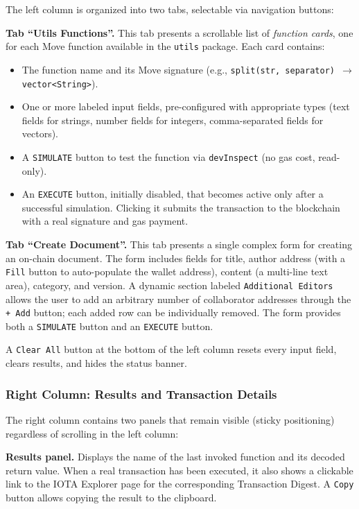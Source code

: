 \documentclass[12pt,a4paper]{article}
\begin{document}
The left column is organized into two tabs, selectable via navigation buttons:

\textbf{Tab ``Utils Functions''.} This tab presents a scrollable list of \emph{function cards}, one for each Move function available in the \texttt{utils} package. Each card contains:
\begin{itemize}
    \item The function name and its Move signature (e.g., \texttt{split(str, separator) $\rightarrow$ vector<String>}).
    \item One or more labeled input fields, pre-configured with appropriate types (text fields for strings, number fields for integers, comma-separated fields for vectors).
    \item A \texttt{SIMULATE} button to test the function via \texttt{devInspect} (no gas cost, read-only).
    \item An \texttt{EXECUTE} button, initially disabled, that becomes active only after a successful simulation. Clicking it submits the transaction to the blockchain with a real signature and gas payment.
\end{itemize}

\textbf{Tab ``Create Document''.} This tab presents a single complex form for creating an on-chain document. The form includes fields for title, author address (with a \texttt{Fill} button to auto-populate the wallet address), content (a multi-line text area), category, and version. A dynamic section labeled \texttt{Additional Editors} allows the user to add an arbitrary number of collaborator addresses through the \texttt{+ Add} button; each added row can be individually removed. The form provides both a \texttt{SIMULATE} button and an \texttt{EXECUTE} button.

A \texttt{Clear All} button at the bottom of the left column resets every input field, clears results, and hides the status banner.

\subsubsection{Right Column: Results and Transaction Details}

The right column contains two panels that remain visible (sticky positioning) regardless of scrolling in the left column:

\textbf{Results panel.} Displays the name of the last invoked function and its decoded return value. When a real transaction has been executed, it also shows a clickable link to the IOTA Explorer page for the corresponding Transaction Digest. A \texttt{Copy} button allows copying the result to the clipboard.
\end{document}
